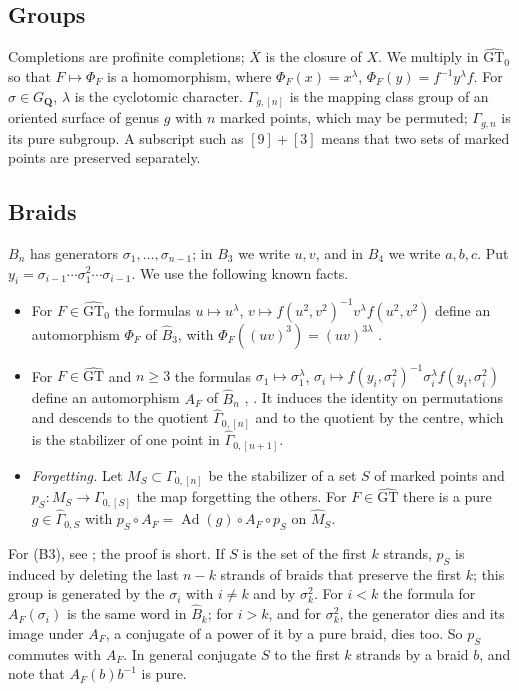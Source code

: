 \documentclass[11pt,a4paper]{article}
\theoremstyle{plain}
\theoremstyle{definition}
\theoremstyle{remark}
\newcommand{\GT}{\widehat{\mathrm{GT}}}
\newcommand{\GTz}{\widehat{\mathrm{GT}}_0}
\newcommand{\GQ}{G_{\mathbf Q}}
\newcommand{\Bh}{\widehat B}
\newcommand{\Gh}{\widehat\Gamma}
\newcommand{\Ad}{\operatorname{Ad}}
\begin{document}
\subsection*{Groups}
Completions are profinite completions; $\overline{X}$ is the closure of $X$. We multiply in $\GTz$ so that
$F\mapsto\Phi_F$ is a homomorphism, where $\Phi_F(x)=x^\lambda$, $\Phi_F(y)=f^{-1}y^\lambda f$. For
$\sigma\in\GQ$, $\lambda$ is the cyclotomic character. $\Gamma_{g,[n]}$ is the mapping class group of an oriented
surface of genus $g$ with $n$ marked points, which may be permuted; $\Gamma_{g,n}$ is its pure subgroup. A subscript
such as $[9]+[3]$ means that two sets of marked points are preserved separately.

\subsection*{Braids}
$B_n$ has generators $\sigma_1,\dots,\sigma_{n-1}$; in $B_3$ we write $u,v$, and in $B_4$ we write $a,b,c$. Put
$y_i=\sigma_{i-1}\cdots\sigma_1^2\cdots\sigma_{i-1}$. We use the following known facts.
\begin{itemize}
\item[(B1)] For $F\in\GTz$ the formulas $u\mapsto u^\lambda$, $v\mapsto f(u^2,v^2)^{-1}v^\lambda f(u^2,v^2)$ define an
automorphism $\Phi_F$ of $\Bh_3$, with $\Phi_F((uv)^3)=(uv)^{3\lambda}$ \cite{LS,HS}.
\item[(B2)] For $F\in\GT$ and $n\ge3$ the formulas $\sigma_1\mapsto\sigma_1^\lambda$,
$\sigma_i\mapsto f(y_i,\sigma_i^2)^{-1}\sigma_i^\lambda f(y_i,\sigma_i^2)$ define an automorphism $A_F$ of $\Bh_n$
\cite{D,LS}, \cite[Theorem 2.1]{LNS}. It induces the identity on permutations and descends to the quotient
$\Gh_{0,[n]}$ and to the quotient by the centre, which is the stabilizer of one point in $\Gh_{0,[n+1]}$.
\item[(B3)] \emph{Forgetting.} Let $M_S\subset\Gamma_{0,[n]}$ be the stabilizer of a set $S$ of marked points and
$p_S:M_S\to\Gamma_{0,[S]}$ the map forgetting the others. For $F\in\GT$ there is a pure $g\in\Gh_{0,S}$ with
$p_S\circ A_F=\Ad(g)\circ A_F\circ p_S$ on $\widehat M_S$.
\end{itemize}
For (B3), see \cite[\S3.1]{HS}; the proof is short. If $S$ is the set of the first $k$ strands, $p_S$ is induced by
deleting the last $n-k$ strands of braids that preserve the first $k$; this group is generated by the $\sigma_i$
with $i\ne k$ and by $\sigma_k^2$. For $i<k$ the formula for $A_F(\sigma_i)$ is the same word in $\Bh_k$; for $i>k$,
and for $\sigma_k^2$, the generator dies and its image under $A_F$, a conjugate of a power of it by a pure braid,
dies too. So $p_S$ commutes with $A_F$. In general conjugate $S$ to the first $k$ strands by a braid $b$, and note
that $A_F(b)b^{-1}$ is pure.
\end{document}
